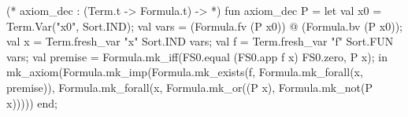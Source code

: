 \nwenddocs{}\plusendmoddef\nwstartdeflinemarkup{}\nwenddeflinemarkup
(* axiom_dec : (Term.t -> Formula.t) ->  *)
fun axiom_dec P =
  let
    val x0 = Term.Var("x0", Sort.IND);
    val vars = (Formula.fv (P x0)) @ (Formula.bv (P x0));
    val x = Term.fresh_var "x" Sort.IND vars;
    val f = Term.fresh_var "f" Sort.FUN vars;
    val premise = Formula.mk_iff(FS0.equal (FS0.app f x)
                                           FS0.zero,
                                P x);
  in
    mk_axiom(Formula.mk_imp(Formula.mk_exists(f, Formula.mk_forall(x, premise)),
                            Formula.mk_forall(x,
                                              Formula.mk_or((P x),
                                                            Formula.mk_not(P x)))))
  end;
\eatline
